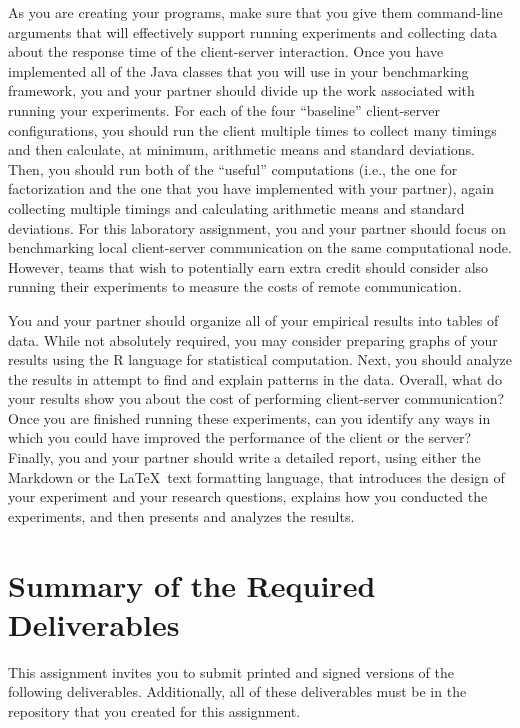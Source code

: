 As you are creating your programs, make sure that you give them command-line arguments that will effectively support
running experiments and collecting data about the response time of the client-server interaction. Once you have
implemented all of the Java classes that you will use in your benchmarking framework, you and your partner should divide
up the work associated with running your experiments. For each of the four ``baseline'' client-server configurations,
you should run the client multiple times to collect many timings and then calculate, at minimum, arithmetic means and
standard deviations. Then, you should run both of the ``useful'' computations (i.e., the one for factorization and the
one that you have implemented with your partner), again collecting multiple timings and calculating arithmetic means and
standard deviations. For this laboratory assignment, you and your partner should focus on benchmarking local
client-server communication on the same computational node. However, teams that wish to potentially earn extra credit
should consider also running their experiments to measure the costs of remote communication.

You and your partner should organize all of your empirical results into tables of data. While not absolutely required,
you may consider preparing graphs of your results using the R language for statistical computation. Next, you should
analyze the results in attempt to find and explain patterns in the data. Overall, what do your results show you about
the cost of performing client-server communication? Once you are finished running these experiments, can you identify
any ways in which you could have improved the performance of the client or the server? Finally, you and your partner
should write a detailed report, using either the Markdown or the \LaTeX~text formatting language, that introduces the
design of your experiment and your research questions, explains how you conducted the experiments, and then presents and
analyzes the results.

\section*{Summary of the Required Deliverables}

This assignment invites you to submit printed and signed versions of the following deliverables. Additionally,
all of these deliverables must be in the repository that you created for this assignment.

